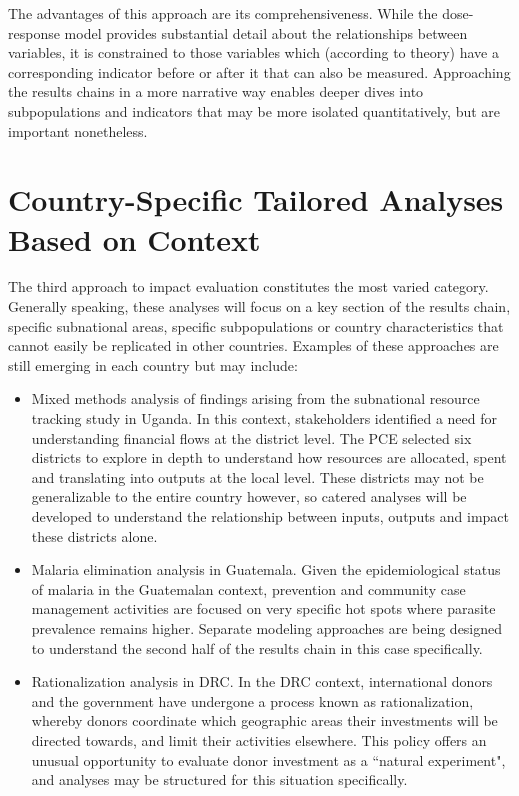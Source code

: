 \documentclass[twocolumn]{bmcart}%
\begin{document}
The advantages of this approach are its comprehensiveness. While the dose-response model provides substantial detail about the relationships between variables, it is constrained to those variables which (according to theory) have a corresponding indicator before or after it that can also be measured. Approaching the results chains in a more narrative way enables deeper dives into subpopulations and indicators that may be more isolated quantitatively, but are important nonetheless. \\

\section{Country-Specific Tailored Analyses Based on Context}

The third approach to impact evaluation constitutes the most varied category. Generally speaking, these analyses will focus on a key section of the results chain, specific subnational areas, specific subpopulations or country characteristics that cannot easily be replicated in other countries. Examples of these approaches are still emerging in each country but may include:

\begin{itemize}
  \item Mixed methods analysis of findings arising from the subnational resource tracking study in Uganda. In this context, stakeholders identified a need for understanding financial flows at the district level. The PCE selected six districts to explore in depth to understand how resources are allocated, spent and translating into outputs at the local level. These districts may not be generalizable to the entire country however, so catered analyses will be developed to understand the relationship between inputs, outputs and impact these districts alone.
  \item Malaria elimination analysis in Guatemala. Given the epidemiological status of malaria in the Guatemalan context, prevention and community case management activities are focused on very specific hot spots where parasite prevalence remains higher. Separate modeling approaches are being designed to understand the second half of the results chain in this case specifically.
  \item Rationalization analysis in DRC. In the DRC context, international donors and the government have undergone a process known as rationalization, whereby donors coordinate which geographic areas their investments will be directed towards, and limit their activities elsewhere. This policy offers an unusual opportunity to evaluate donor investment as a ``natural experiment", and analyses may be structured for this situation specifically.
\end{itemize}
\end{document}
